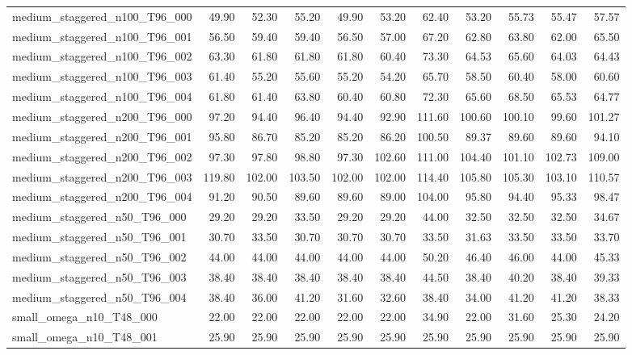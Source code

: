 \begin{table}[htbp]
\begin{tabular}{lrrrrrrrrrr}
medium\_staggered\_n100\_T96\_000 & 49.90 & 52.30 & 55.20 & 49.90 & 53.20 & 62.40 & 53.20 & 55.73 & 55.47 & 57.57 \\
medium\_staggered\_n100\_T96\_001 & 56.50 & 59.40 & 59.40 & 56.50 & 57.00 & 67.20 & 62.80 & 63.80 & 62.00 & 65.50 \\
medium\_staggered\_n100\_T96\_002 & 63.30 & 61.80 & 61.80 & 61.80 & 60.40 & 73.30 & 64.53 & 65.60 & 64.03 & 64.43 \\
medium\_staggered\_n100\_T96\_003 & 61.40 & 55.20 & 55.60 & 55.20 & 54.20 & 65.70 & 58.50 & 60.40 & 58.00 & 60.60 \\
medium\_staggered\_n100\_T96\_004 & 61.80 & 61.40 & 63.80 & 60.40 & 60.80 & 72.30 & 65.60 & 68.50 & 65.53 & 64.77 \\
medium\_staggered\_n200\_T96\_000 & 97.20 & 94.40 & 96.40 & 94.40 & 92.90 & 111.60 & 100.60 & 100.10 & 99.60 & 101.27 \\
medium\_staggered\_n200\_T96\_001 & 95.80 & 86.70 & 85.20 & 85.20 & 86.20 & 100.50 & 89.37 & 89.60 & 89.60 & 94.10 \\
medium\_staggered\_n200\_T96\_002 & 97.30 & 97.80 & 98.80 & 97.30 & 102.60 & 111.00 & 104.40 & 101.10 & 102.73 & 109.00 \\
medium\_staggered\_n200\_T96\_003 & 119.80 & 102.00 & 103.50 & 102.00 & 102.00 & 114.40 & 105.80 & 105.30 & 103.10 & 110.57 \\
medium\_staggered\_n200\_T96\_004 & 91.20 & 90.50 & 89.60 & 89.60 & 89.00 & 104.00 & 95.80 & 94.40 & 95.33 & 98.47 \\
medium\_staggered\_n50\_T96\_000 & 29.20 & 29.20 & 33.50 & 29.20 & 29.20 & 44.00 & 32.50 & 32.50 & 32.50 & 34.67 \\
medium\_staggered\_n50\_T96\_001 & 30.70 & 33.50 & 30.70 & 30.70 & 30.70 & 33.50 & 31.63 & 33.50 & 33.50 & 33.70 \\
medium\_staggered\_n50\_T96\_002 & 44.00 & 44.00 & 44.00 & 44.00 & 44.00 & 50.20 & 46.40 & 46.00 & 44.00 & 45.33 \\
medium\_staggered\_n50\_T96\_003 & 38.40 & 38.40 & 38.40 & 38.40 & 38.40 & 44.50 & 38.40 & 40.20 & 38.40 & 39.33 \\
medium\_staggered\_n50\_T96\_004 & 38.40 & 36.00 & 41.20 & 31.60 & 32.60 & 38.40 & 34.00 & 41.20 & 41.20 & 38.33 \\
small\_omega\_n10\_T48\_000 & 22.00 & 22.00 & 22.00 & 22.00 & 22.00 & 34.90 & 22.00 & 31.60 & 25.30 & 24.20 \\
small\_omega\_n10\_T48\_001 & 25.90 & 25.90 & 25.90 & 25.90 & 25.90 & 25.90 & 25.90 & 25.90 & 25.90 & 25.90 \\

\end{tabular}
\end{table}
